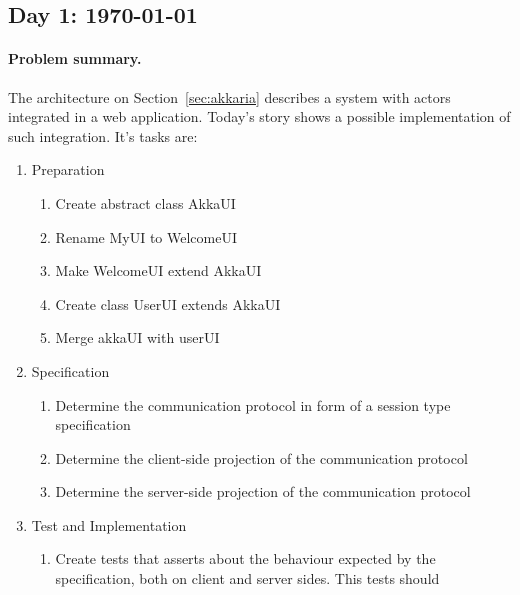 
\subsection{Day 1:  \today}
\label{sec:day-1}


\paragraph{Problem summary.}
The architecture on Section~\ref{sec:akkaria} describes a system with
\akka actors integrated in a \vaadin web application.
%
Today's story shows a possible implementation of such
integration. It's tasks are:

\begin{enumerate}
\item Preparation
  \begin{enumerate}
  \item Create abstract class AkkaUI\\
  \item Rename MyUI to WelcomeUI\\
  \item Make WelcomeUI extend AkkaUI\\
  \item Create class UserUI extends AkkaUI\\
  \item Merge akkaUI with userUI\\
  \end{enumerate}
\item Specification
  \begin{enumerate}
  \item Determine the communication protocol in form of a session type
    specification
  \item Determine the client-side projection of the communication
    protocol
  \item Determine the server-side projection of the communication
    protocol
  \end{enumerate}
\item Test and Implementation
  \begin{enumerate}
  \item Create tests that asserts about the behaviour expected by the
    specification, both on client and server sides. This tests should

\end{enumerate}
\end{enumerate}
